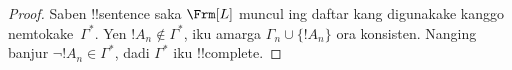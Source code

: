 \documentclass[../../../include/open-logic-section]{subfiles}
\begin{document}
\begin{proof}
Saben !!{sentence} saka $\Frm[L]$ muncul ing daftar kang digunakake
kanggo nemtokake~$\Gamma^*$. Yen $!A_n \notin \Gamma^*$, iku amarga
$\Gamma_n \cup \{!A_n\}$ ora konsisten. Nanging banjur $\lnot !A_n
\in \Gamma^*$, dadi $\Gamma^*$ iku !!{complete}.
\end{proof}
\end{document}

